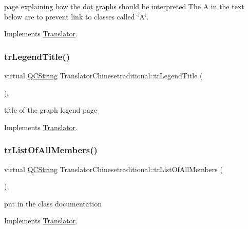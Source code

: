 page explaining how the dot graph\textquotesingle{}s should be interpreted The A in the text below are to prevent link to classes called \char`\"{}\+A\char`\"{}. 

Implements \mbox{\hyperlink{class_translator}{Translator}}.

\mbox{\label{class_translator_chinesetraditional_a4229fcbab46c55b5a8cf3977149c26f3}} 
\subsubsection{\texorpdfstring{trLegendTitle()}{trLegendTitle()}}
{\footnotesize\ttfamily virtual \mbox{\hyperlink{class_q_c_string}{Q\+C\+String}} Translator\+Chinesetraditional\+::tr\+Legend\+Title (\begin{DoxyParamCaption}{ }\end{DoxyParamCaption})\hspace{0.3cm}{\ttfamily [inline]}, {\ttfamily [virtual]}}

title of the graph legend page 

Implements \mbox{\hyperlink{class_translator}{Translator}}.

\mbox{\label{class_translator_chinesetraditional_a2cf1edd61c495a0858c2a40a97a8212a}} 
\subsubsection{\texorpdfstring{trListOfAllMembers()}{trListOfAllMembers()}}
{\footnotesize\ttfamily virtual \mbox{\hyperlink{class_q_c_string}{Q\+C\+String}} Translator\+Chinesetraditional\+::tr\+List\+Of\+All\+Members (\begin{DoxyParamCaption}{ }\end{DoxyParamCaption})\hspace{0.3cm}{\ttfamily [inline]}, {\ttfamily [virtual]}}

put in the class documentation 

Implements \mbox{\hyperlink{class_translator}{Translator}}.

